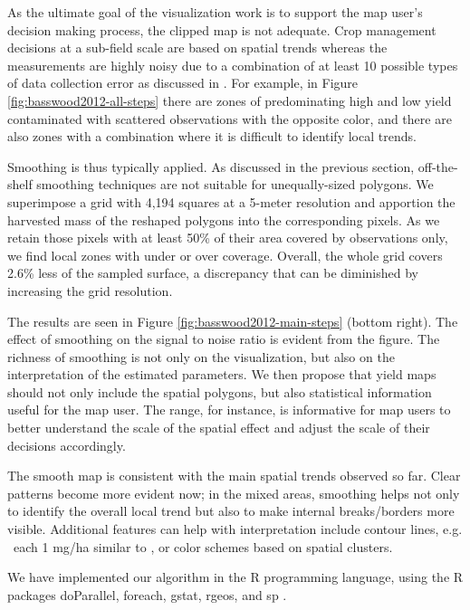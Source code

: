  As the ultimate goal of the visualization
work is to support the map user's decision making process, the clipped
map is not adequate. Crop management decisions at a sub-field scale
are based on spatial trends whereas the measurements are highly noisy
due to a combination of at least 10 possible types of data collection
error as discussed in \cite{Lyle2013}. For example, in Figure
\ref{fig:basswood2012-all-steps} there are zones of predominating high
and low yield contaminated with scattered observations with the
opposite color, and there are also zones with a combination where it
is difficult to identify local trends.

 Smoothing is thus
typically applied. As discussed in the previous section,
off-the-shelf smoothing techniques are not suitable for
unequally-sized polygons. We superimpose a grid with 4,194 squares at
a 5-meter resolution and apportion the harvested mass of the reshaped
polygons into the corresponding pixels. As we retain those pixels with
at least 50\% of their area covered by observations only, we find
local zones with under or over coverage. Overall, the whole grid
covers 2.6\% less of the sampled surface, a discrepancy that can be
diminished by increasing the grid resolution.

 The results are seen in Figure
\ref{fig:basswood2012-main-steps} (bottom right). The effect of
smoothing on the signal to noise ratio is evident from the figure. The
richness of smoothing is not only on the visualization, but also on
the interpretation of the estimated parameters. We then propose that
yield maps should not only include the spatial polygons, but also
statistical information useful for the map user. The range, for
instance, is informative for map users to better understand the scale
of the spatial effect and adjust the scale of their decisions
accordingly. %

 The smooth map is consistent with
the main spatial trends observed so far. Clear patterns become more
evident now; in the mixed areas, smoothing helps not only to identify
the overall local trend but also to make internal breaks/borders more
visible. Additional features can help with interpretation include
contour lines, e.g. \ each 1 mg/ha similar to \cite{Blackmore1999}, or
color schemes based on spatial clusters.

We have implemented our algorithm in the R programming language, using
the R packages doParallel, foreach, gstat, rgeos, and sp
\citep{Pebesma2004, Pebesma2005, Bivand2013, Graeler2016,
  Microsoft2017, Corporation2018, RCT2019, Bivand2019}.

